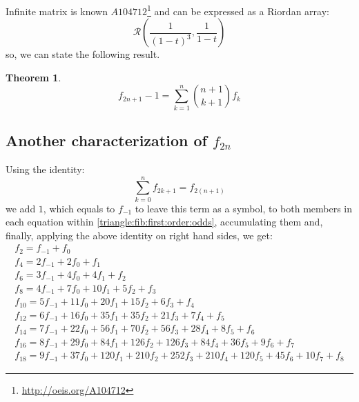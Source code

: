 \documentclass[a4paper,dottedtoc,headinclude,footinclude]{report} %
\theoremstyle{plain}
\newtheorem{thm}{Theorem}[section]
\begin{document}
    Infinite matrix is known $A104712$\footnote{\url{http://oeis.org/A104712}}
    and can be expressed as a Riordan array:
    \begin{displaymath}
        \mathcal{R}\left(\frac{1}{(1-t)^3}, \frac{1}{1-t}\right)
    \end{displaymath}
    so, we can state the following result.
    \begin{thm}
        \begin{displaymath}
            f_{2n+1} - 1 = \sum_{k=1}^{n}{{{n+1}\choose{k+1}}f_{k}}
        \end{displaymath}
    \end{thm}
    
    \subsection{Another characterization of $f_{2n}$}
    Using the identity:
    \begin{displaymath}
        \sum_{k=0}^{n} f_{2 k + 1} = f_{2 (n+1)}
    \end{displaymath}
    we add $1$, which equals to $f_{-1}$ to leave this term
    as a symbol, to both members in each equation within 
    \autoref{triangle:fib:first:order:odds}, accumulating them
    and, finally, applying the above identity on right hand sides, we get:
    \begin{displaymath}
        \begin{array}{c}
            f_{2} = f_{-1} + f_{0}\\
            f_{4} =2 f_{-1} + 2 f_{0} + f_{1}\\
            f_{6} =3 f_{-1} + 4 f_{0} + 4 f_{1} + f_{2}\\
            f_{8} =4 f_{-1} + 7 f_{0} + 10 f_{1} + 5 f_{2} + f_{3}\\
            f_{10} =5 f_{-1} + 11 f_{0} + 20 f_{1} + 15 f_{2} + 6 f_{3} + f_{4}\\
            f_{12} =6 f_{-1} + 16 f_{0} + 35 f_{1} + 35 f_{2} + 21 f_{3} + 7 f_{4} + f_{5}\\
            f_{14} =7 f_{-1} + 22 f_{0} + 56 f_{1} + 70 f_{2} + 56 f_{3} + 28 f_{4} + 8 f_{5} + f_{6}\\
            f_{16} =8 f_{-1} + 29 f_{0} + 84 f_{1} + 126 f_{2} + 126 f_{3} + 84 f_{4} + 36 f_{5} + 9 f_{6} + f_{7}\\
            f_{18} =9 f_{-1} + 37 f_{0} + 120 f_{1} + 210 f_{2} + 252 f_{3} + 210 f_{4} + 120 f_{5} + 45 f_{6} + 10 f_{7} + f_{8}
            \end{array}
    \end{displaymath}
\end{document}
